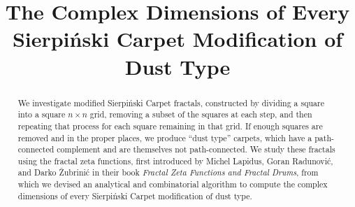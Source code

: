 \documentclass{article}
\theoremstyle{plain}
\numberwithin{equation}{section}
\numberwithin{table}{section}
\numberwithin{figure}{section}
\begin{document}
\title{The Complex Dimensions of Every Sierpi\'nski Carpet Modification of Dust Type}






\begin{abstract}
We investigate modified Sierpi\'nski Carpet fractals, constructed by dividing a square into a square $n \times n$ grid, removing a subset of the squares at each step, and then repeating that process for each square remaining in that grid. If enough squares are removed and in the proper places, we produce ``dust type'' carpets, which have a path-connected complement and are themselves not path-connected. We study these fractals using the fractal zeta functions, first introduced by Michel Lapidus, Goran Radunovi\'c, and Darko \v{Z}ubrini\'c in their book \emph{Fractal Zeta Functions and Fractal Drums}, from which we devised an analytical and combinatorial algorithm to compute the complex dimensions of every Sierpi\'nski Carpet modification of dust type.
\end{abstract}

\maketitle
\end{document}
